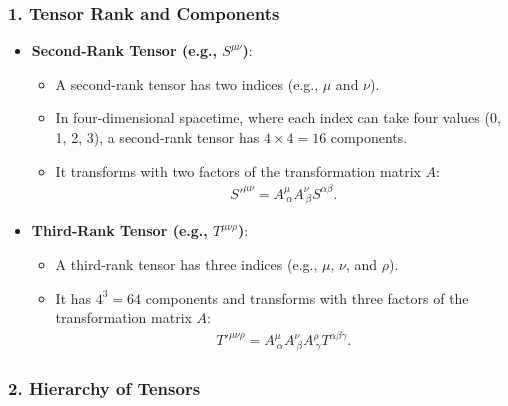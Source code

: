 \documentclass[11pt,letterpaper]{book}
\begin{document}
            \subsubsection{1. Tensor Rank and Components}
                \begin{itemize}
                    \item \textbf{Second-Rank Tensor (e.g., \( S^{\mu \nu} \))}:
                    \begin{itemize}
                        \item A second-rank tensor has two indices (e.g., \( \mu \) and \( \nu \)).
                        \item In four-dimensional spacetime, where each index can take four values (0, 1, 2, 3), a second-rank tensor has \( 4 \times 4 = 16 \) components.
                        \item It transforms with two factors of the transformation matrix \( A \):
                        \begin{align}
                        S'^{\mu \nu} = A^\mu_{\ \alpha} A^\nu_{\ \beta} S^{\alpha \beta}.
                        \end{align}
                        \end{itemize}
                
                    \item \textbf{Third-Rank Tensor (e.g., \( T^{\mu \nu \rho} \))}:
                    \begin{itemize}
                        \item A third-rank tensor has three indices (e.g., \( \mu \), \( \nu \), and \( \rho \)).
                        \item It has \( 4^3 = 64 \) components and transforms with three factors of the transformation matrix \( A \):
                        \begin{align}
                        T'^{\mu \nu \rho} = A^\mu_{\ \alpha} A^\nu_{\ \beta} A^\rho_{\ \gamma} T^{\alpha \beta \gamma}.
                        \end{align}
                    \end{itemize}
                \end{itemize}
            
            \subsubsection{2. Hierarchy of Tensors}
            
\end{document}
